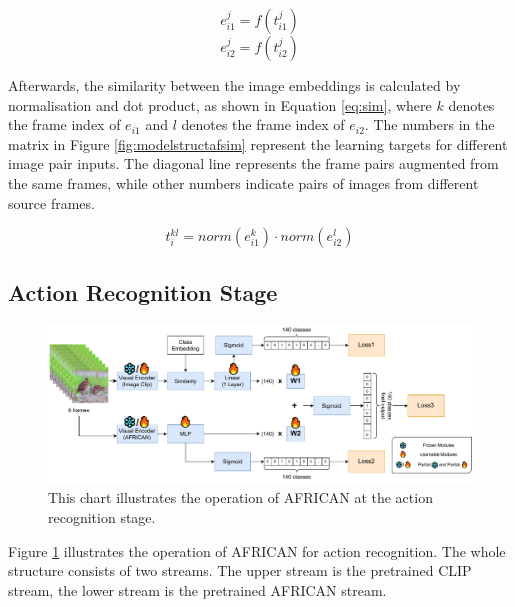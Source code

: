 \begin{equation}
    \label{eq:enc1}
    e_{i1}^j = f(t_{i1}^j)
\end{equation}
\begin{equation}
    \label{eq:enc2}
    e_{i2}^j = f(t_{i2}^j)
\end{equation}

Afterwards, the similarity between the image embeddings is calculated by normalisation and dot product, as shown in Equation \ref{eq:sim}, where $k$ denotes the frame index of $e_{i1}$ and $l$ denotes the frame index of $e_{i2}$. The numbers in the matrix in Figure \ref{fig:modelstructafsim} represent the learning targets for different image pair inputs. The diagonal line represents the frame pairs augmented from the same frames, while other numbers indicate pairs of images from different source frames. 

\begin{equation}
    \label{eq:sim}
    t_{i}^{kl} = norm(e_{i1}^{k}) \cdot norm(e_{i2}^{l})
\end{equation}




\subsection{Action Recognition Stage}

\begin{figure}[ht]
    \centering
    \includegraphics[width=1.0\textwidth]{assets/imgs/3_4_ModelStructureAF}
    \caption[Operation of AFRICAN at the action recognition stage]{This chart illustrates the operation of AFRICAN at the action recognition stage.}
    \label{fig:modelstructaf_ar}
\end{figure}

Figure \ref{fig:modelstructaf_ar} illustrates the operation of AFRICAN for action recognition. The whole structure consists of two streams. The upper stream is the pretrained CLIP stream, the lower stream is the pretrained AFRICAN stream. 

